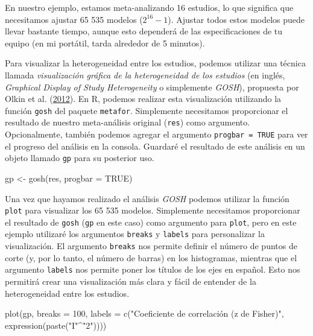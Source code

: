 \documentclass[
  bookmarksnumbered]{article}
\newenvironment{Shaded}{\begin{snugshade}}{\end{snugshade}}
\newcommand{\AttributeTok}[1]{\textcolor[rgb]{0.00,0.34,0.68}{#1}}
\newcommand{\ConstantTok}[1]{\textcolor[rgb]{0.67,0.33,0.00}{#1}}
\newcommand{\DecValTok}[1]{\textcolor[rgb]{0.69,0.50,0.00}{#1}}
\newcommand{\FunctionTok}[1]{\textcolor[rgb]{0.39,0.29,0.61}{#1}}
\newcommand{\NormalTok}[1]{\textcolor[rgb]{0.12,0.11,0.11}{#1}}
\newcommand{\OtherTok}[1]{\textcolor[rgb]{0.00,0.43,0.16}{#1}}
\newcommand{\SpecialCharTok}[1]{\textcolor[rgb]{0.24,0.68,0.91}{#1}}
\newcommand{\StringTok}[1]{\textcolor[rgb]{0.75,0.01,0.01}{#1}}
\begin{document}
En nuestro ejemplo, estamos meta-analizando 16 estudios, lo que significa que necesitamos ajustar 65 535 modelos (\(2^{16} - 1\)). Ajustar todos estos modelos puede llevar bastante tiempo, aunque esto dependerá de las especificaciones de tu equipo (en mi portátil, tarda alrededor de 5 minutos).

Para visualizar la heterogeneidad entre los estudios, podemos utilizar una técnica llamada \emph{visualización gráfica de la heterogeneidad de los estudios} (en inglés, \emph{Graphical Display of Study Heterogeneity} o simplemente \emph{GOSH}), propuesta por Olkin et al. (\protect\hyperlink{ref-olkinGOSHGraphicalDisplay2012}{2012}). En R, podemos realizar esta visualización utilizando la función \texttt{gosh} del paquete \texttt{metafor}. Simplemente necesitamos proporcionar el resultado de nuestro meta-análisis original (\texttt{res}) como argumento. Opcionalmente, también podemos agregar el argumento \texttt{progbar\ =\ TRUE} para ver el progreso del análisis en la consola. Guardaré el resultado de este análisis en un objeto llamado \texttt{gp} para su posterior uso.

\begin{Shaded}
\begin{Highlighting}[]
\NormalTok{gp }\OtherTok{\textless{}{-}} \FunctionTok{gosh}\NormalTok{(res, }\AttributeTok{progbar =} \ConstantTok{TRUE}\NormalTok{)}
\end{Highlighting}
\end{Shaded}

Una vez que hayamos realizado el análisis \emph{GOSH} podemos utilizar la función \texttt{plot} para visualizar los 65 535 modelos. Simplemente necesitamos proporcionar el resultado de \texttt{gosh} (\texttt{gp} en este caso) como argumento para \texttt{plot}, pero en este ejemplo utilizaré los argumentos \texttt{breaks} y \texttt{labels} para personalizar la visualización. El argumento \texttt{breaks} nos permite definir el número de puntos de corte (y, por lo tanto, el número de barras) en los histogramas, mientras que el argumento \texttt{labels} nos permite poner los títulos de los ejes en español. Esto nos permitirá crear una visualización más clara y fácil de entender de la heterogeneidad entre los estudios.

\begin{Shaded}
\begin{Highlighting}[]
\FunctionTok{plot}\NormalTok{(gp, }
     \AttributeTok{breaks =} \DecValTok{100}\NormalTok{,}
     \AttributeTok{labels =} \FunctionTok{c}\NormalTok{(}\StringTok{"Coeficiente de correlación (z de Fisher)"}\NormalTok{, }
                \FunctionTok{expression}\NormalTok{(}\FunctionTok{paste}\NormalTok{(}\StringTok{"I"}\SpecialCharTok{\^{}}\StringTok{"2"}\NormalTok{))))}
\end{Highlighting}
\end{Shaded}
\end{document}
